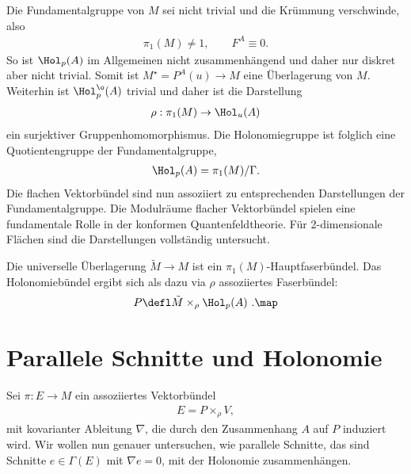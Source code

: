 \documentclass[%
	paper=a5,%
	fleqn,%
	DIV=18,%
	BCOR=0mm,
	fontsize=11pt,
	titlepage=false,%
	bibliography=totoc,
	DIV=18,%
	twoside=true,
	pdftitle=Riemannsche Geometrie,
	pdfauthor=Uwe Semmelmann,
	numbers=noendperiod]%
	{scrbook}
\begin{document}
\begin{rem}
Die Fundamentalgruppe von $M$ sei nicht trivial und die Krümmung verschwinde, also
\begin{align*}
\pi_{1}(M)\neq 1,\qquad F^A\equiv 0.
\end{align*}
So ist $\Hol_{p}(A)$ im Allgemeinen nicht zusammenhängend und daher nur diskret aber nicht trivial. Somit ist $M^\star = P^A(u)\to M$ eine Überlagerung von $M$. Weiterhin ist $\Hol_{p}^\o(A)$ trivial und daher ist die Darstellung
\begin{align*}
\rho: \pi_{1}(M)\to \Hol_{u}(A)
\end{align*}
ein surjektiver Gruppenhomomorphismus. Die Holonomiegruppe ist folglich eine Quotientengruppe der Fundamentalgruppe,
\begin{align*}
\Hol_{p}(A) = \pi_{1}(M)/\Gamma.
\end{align*}
Die flachen Vektorbündel sind nun assoziiert zu entsprechenden Darstellungen der Fundamentalgruppe. Die Modulr\"aume
flacher Vektorb\"undel  spielen eine fundamentale Rolle in der konformen Quantenfeldtheorie. Für 2-dimensionale Flächen sind die Darstellungen vollständig untersucht.

Die universelle Überlagerung  $\tilde M \to M$ ist ein $\pi_{1}(M)$-Hauptfaserbündel. Das Holonomiebündel ergibt sich
als dazu via $\rho$ assoziiertes Faserbündel:
\begin{align*}
P\defl \tilde M \times_{\rho}\Hol_{p}(A) \ .\map
\end{align*}

\end{rem}



\section{Parallele Schnitte und Holonomie}

Sei $\pi: E\to M$ ein assoziiertes Vektorbündel
\begin{align*}
E = P\times_\rho V,
\end{align*}
mit kovarianter Ableitung $\nabla$, die durch den Zusammenhang $A$ auf $P$ induziert wird. Wir wollen nun genauer untersuchen, wie parallele Schnitte, das sind Schnitte $e\in\Gamma(E)$ mit $\nabla e = 0$, mit der Holonomie zusammenhängen.
\end{document}
